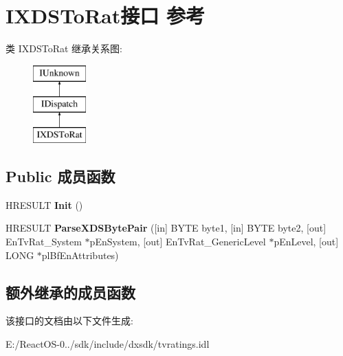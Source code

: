 \hypertarget{interface_i_x_d_s_to_rat}{}\section{I\+X\+D\+S\+To\+Rat接口 参考}
\label{interface_i_x_d_s_to_rat}
类 I\+X\+D\+S\+To\+Rat 继承关系图\+:\begin{figure}[H]
\begin{center}
\leavevmode
\includegraphics[height=3.000000cm]{interface_i_x_d_s_to_rat}
\end{center}
\end{figure}
\subsection*{Public 成员函数}
\begin{DoxyCompactItemize}
\item 
\mbox{\label{interface_i_x_d_s_to_rat_a945a5e7aeb221f43171486dcb7193b47}} 
H\+R\+E\+S\+U\+LT {\bfseries Init} ()
\item 
\mbox{\label{interface_i_x_d_s_to_rat_ae7e4796a28633b120f9225315b112286}} 
H\+R\+E\+S\+U\+LT {\bfseries Parse\+X\+D\+S\+Byte\+Pair} (\mbox{[}in\mbox{]} B\+Y\+TE byte1, \mbox{[}in\mbox{]} B\+Y\+TE byte2, \mbox{[}out\mbox{]} En\+Tv\+Rat\+\_\+\+System $\ast$p\+En\+System, \mbox{[}out\mbox{]} En\+Tv\+Rat\+\_\+\+Generic\+Level $\ast$p\+En\+Level, \mbox{[}out\mbox{]} L\+O\+NG $\ast$pl\+Bf\+En\+Attributes)
\end{DoxyCompactItemize}
\subsection*{额外继承的成员函数}


该接口的文档由以下文件生成\+:\begin{DoxyCompactItemize}
\item 
E\+:/\+React\+O\+S-\/0../sdk/include/dxsdk/tvratings.\+idl\end{DoxyCompactItemize}
